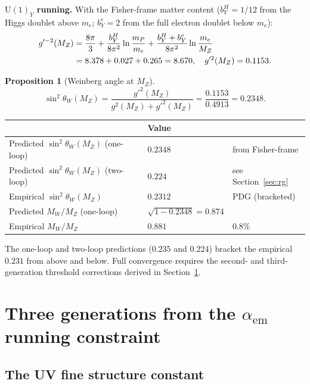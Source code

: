 \documentclass[12pt]{article}
\newtheorem{proposition}[theorem]{Proposition}
\theoremstyle{definition}
\theoremstyle{remark}
\begin{document}
\noindent\textbf{$\mathrm{U}(1)_Y$ running.}  With the Fisher-frame matter
content ($b_Y^H=1/12$ from the Higgs doublet above $m_e$;
$b_Y^e=2$ from the full electron doublet below $m_e$):
\begin{align}
g'^{-2}(M_Z)&=\frac{8\pi}{3}
+\frac{b_Y^H}{8\pi^2}\ln\frac{m_P}{m_e}
+\frac{b_Y^H+b_Y^e}{8\pi^2}\ln\frac{m_e}{M_Z}\notag\\
&=8.378+0.027+0.265=8.670,\quad g'^2(M_Z)=0.1153.
\end{align}

\begin{proposition}[Weinberg angle at $M_Z$]
\begin{equation}
\sin^2\theta_W(M_Z)=\frac{g'^2(M_Z)}{g^2(M_Z)+g'^2(M_Z)}
=\frac{0.1153}{0.4913}=0.2348.
\end{equation}
\end{proposition}

\medskip
\begin{center}
\begin{tabular}{lll}\toprule
& Value & \\\midrule
Predicted $\sin^2\theta_W(M_Z)$ (one-loop) & $0.2348$ & from Fisher-frame\\
Predicted $\sin^2\theta_W(M_Z)$ (two-loop) & $0.224$ & see Section~\ref{sec:rg}\\
Empirical $\sin^2\theta_W(M_Z)$ & $0.2312$ & PDG (bracketed)\\
Predicted $M_W/M_Z$ (one-loop) & $\sqrt{1-0.2348}=0.874$ & \\
Empirical $M_W/M_Z$ & $0.881$ & $0.8\%$\\\bottomrule
\end{tabular}
\end{center}

The one-loop and two-loop predictions ($0.235$ and $0.224$) bracket the
empirical $0.231$ from above and below.  Full convergence requires the
second- and third-generation threshold corrections derived in
Section~\ref{sec:gen}.

\section{Three generations from the $\alpha_{\mathrm{em}}$ running constraint}
\label{sec:gen}

\subsection{The UV fine structure constant}
\end{document}
